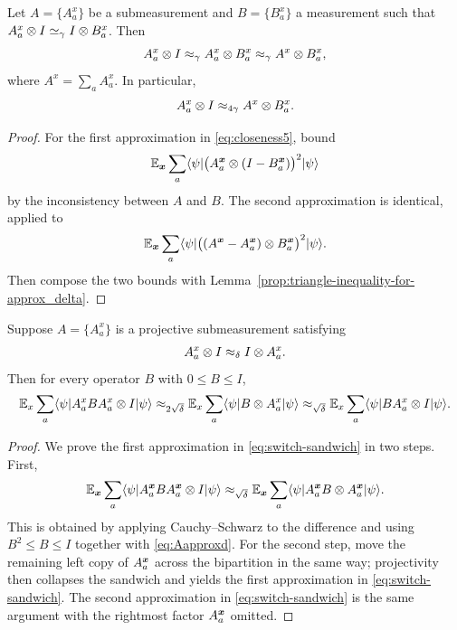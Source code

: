 \begin{lemma}\label{prop:cons-sub-meas}
	\leanok
	Let $A=\{A_a^x\}$ be a submeasurement and $B=\{B_a^x\}$ a measurement such that $A_a^x \otimes I \simeq_\gamma I \otimes B_a^x$. Then
	\begin{equation}
		A_a^x \otimes I \approx_\gamma A_a^x \otimes B_a^x \approx_\gamma A^x \otimes B_a^x,
		\label{eq:closeness5}
	\end{equation}
	where $A^x=\sum_a A_a^x$. In particular,
	\[
		A_a^x \otimes I \approx_{4\gamma} A^x \otimes B_a^x.
	\]
\end{lemma}
\begin{proof}
	\leanok
	For the first approximation in \eqref{eq:closeness5}, bound
	\[
		\mathbb{E}_{{\boldsymbol{x}}} \sum_a \langle \psi \rvert \bigl(A^{{\boldsymbol{x}}}_a \otimes (I-B^{{\boldsymbol{x}}}_a)\bigr)^2 \lvert \psi \rangle
	\]
	by the inconsistency between $A$ and $B$. The second approximation is identical, applied to
	\[
		\mathbb{E}_{{\boldsymbol{x}}} \sum_a \langle \psi \rvert \bigl((A^{\boldsymbol{x}}-A^{\boldsymbol{x}}_a)\otimes B^{\boldsymbol{x}}_a\bigr)^2 \lvert \psi \rangle.
	\]
	Then compose the two bounds with Lemma~\ref{prop:triangle-inequality-for-approx_delta}.
\end{proof}

\begin{lemma}\label{prop:switch-sandwich}
	\leanok
	Suppose $A=\{A_a^x\}$ is a projective submeasurement satisfying
	\begin{equation}
		A_a^x \otimes I \approx_\delta I \otimes A_a^x.
		\label{eq:Aapproxd}
	\end{equation}
	Then for every operator $B$ with $0 \le B \le I$,
	\begin{equation}
		\mathbb{E}_x \sum_a \langle \psi \rvert A_a^x B A_a^x \otimes I \lvert \psi \rangle
		\approx_{2\sqrt\delta}
		\mathbb{E}_x \sum_a \langle \psi \rvert B \otimes A_a^x \lvert \psi \rangle
		\approx_{\sqrt\delta}
		\mathbb{E}_x \sum_a \langle \psi \rvert BA_a^x \otimes I \lvert \psi \rangle.
		\label{eq:switch-sandwich}
	\end{equation}
\end{lemma}
\begin{proof}
	\leanok
	We prove the first approximation in \eqref{eq:switch-sandwich} in two steps. First,
	\begin{equation}
		\mathbb{E}_{{\boldsymbol{x}}} \sum_a \langle \psi \rvert A^{{\boldsymbol{x}}}_a B A^{{\boldsymbol{x}}}_a \otimes I \lvert \psi \rangle
		\approx_{\sqrt{\delta}}
		\mathbb{E}_{{\boldsymbol{x}}} \sum_a \langle \psi \rvert A^{{\boldsymbol{x}}}_a B \otimes A^{{\boldsymbol{x}}}_a \lvert \psi \rangle.
		\label{eq:shift-right-A}
	\end{equation}
	This is obtained by applying Cauchy--Schwarz to the difference and using $B^2 \le B \le I$ together with \eqref{eq:Aapproxd}. For the second step, move the remaining left copy of $A^{\boldsymbol{x}}_a$ across the bipartition in the same way; projectivity then collapses the sandwich and yields the first approximation in \eqref{eq:switch-sandwich}. The second approximation in \eqref{eq:switch-sandwich} is the same argument with the rightmost factor $A_a^{\boldsymbol{x}}$ omitted.
\end{proof}

